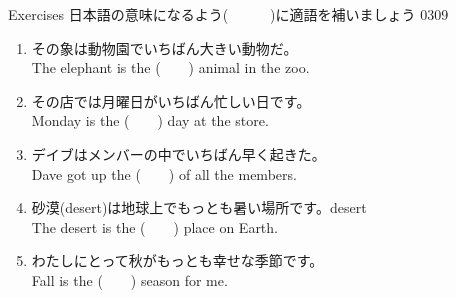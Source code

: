\documentclass[aspectratio=169,xcolor={dvipsnames,table}]{beamer}
\begin{document}
\begin{frame}[plain]{Exercises}
日本語の意味になるよう(~~~~~~)に適語を補いましょう%
\hfill{\tiny 0309}\,{\scriptsize {}}
 \begin{enumerate}
  \item その象は動物園でいちばん大きい動物だ。\\
	The elephant is the (~~~~) animal in the zoo. \visible<2->{または\textcolor{Maroon}{\bfseries biggest}}
  \item その店では月曜日がいちばん忙しい日です。\\
	Monday is the (~~~~) day at the store.
  \item デイブはメンバーの中でいちばん早く起きた。\\
	Dave got up the (~~~~) of all the members.
  \item 砂漠(desert)は地球上でもっとも暑い場所です。\hfill{\scriptsize desert }\\
	The desert is the (~~~~) place on Earth.
  \item わたしにとって秋がもっとも幸せな季節です。\\
	Fall  is the (~~~~) season for me.
 \end{enumerate}
\end{frame}
\end{document}
